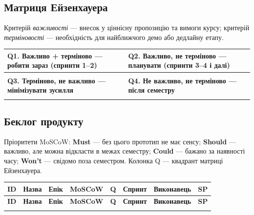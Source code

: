 \documentclass[12pt]{article}
\begin{document}
\subsection{Матриця Ейзенхауера}
Критерій \emph{важливості} --- внесок у ціннісну пропозицію та вимоги курсу; критерій \emph{терміновості} --- необхідність для найближчого демо або дедлайну етапу.

\renewcommand{\arraystretch}{1.1}
\footnotesize
\begin{tabularx}{\textwidth}{|Y|Y|}
\hline
{}\textbf{Q1. Важливо + терміново --- робити зараз (спринти 1--2)} & \textbf{Q2. Важливо, не терміново --- планувати (спринти 3--4 і далі)}\\
\hline
\begin{itemize}[leftmargin=1em,nosep]\end{itemize} &
\begin{itemize}[leftmargin=1em,nosep]\end{itemize}\\
\hline
{}\textbf{Q3. Терміново, не важливо --- мінімізувати зусилля} & \textbf{Q4. Не важливо, не терміново --- після семестру}\\
\hline
\begin{itemize}[leftmargin=1em,nosep]\end{itemize} &
\begin{itemize}[leftmargin=1em,nosep]\end{itemize}\\
\hline
\end{tabularx}
\normalsize
\renewcommand{\arraystretch}{1.3}

\subsection{Беклог продукту}
Пріоритети MoSCoW: \textbf{Must} --- без цього прототип не має сенсу; \textbf{Should} --- важливо, але можна відкласти в межах семестру; \textbf{Could} --- бажано за наявності часу; \textbf{Won't} --- свідомо поза семестром. Колонка Q --- квадрант матриці Ейзенхауера.

\begin{landscape}
\footnotesize
\renewcommand{\arraystretch}{1.15}
\begin{longtable}{l L{7.2cm} L{3.4cm} l c l l c}
\toprule
\textbf{ID} & \textbf{Назва} & \textbf{Епік} & \textbf{MoSCoW} & \textbf{Q} & \textbf{Спринт} & \textbf{Виконавець} & \textbf{SP}\\
\midrule
\endfirsthead
\toprule
\textbf{ID} & \textbf{Назва} & \textbf{Епік} & \textbf{MoSCoW} & \textbf{Q} & \textbf{Спринт} & \textbf{Виконавець} & \textbf{SP}\\
\midrule
\endhead
\bottomrule
\endfoot

\end{longtable}
\end{landscape}
\end{document}
